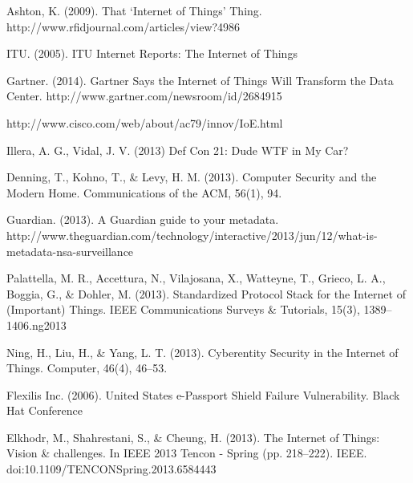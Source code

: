 \documentclass[10pt,journal,compsoc]{IEEEtran}
\begin{document}

%
%
%
\begin{thebibliography}{1}

Ashton, K. (2009). That `Internet of Things' Thing. http://www.rfidjournal.com/articles/view?4986

ITU. (2005). ITU Internet Reports: The Internet of Things

Gartner. (2014). Gartner Says the Internet of Things Will Transform the Data Center. http://www.gartner.com/newsroom/id/2684915

http://www.cisco.com/web/about/ac79/innov/IoE.html

Illera, A. G., Vidal, J. V. (2013) Def Con 21: Dude WTF in My Car?  

Denning, T., Kohno, T., \& Levy, H. M. (2013). Computer Security and the Modern Home. Communications of the ACM, 56(1), 94. 

Guardian. (2013). A Guardian guide to your metadata. http://www.theguardian.com/technology/interactive/2013/jun/12/what-is-metadata-nsa-surveillance

Palattella, M. R., Accettura, N., Vilajosana, X., Watteyne, T., Grieco, L. A., Boggia, G., \& Dohler, M. (2013). Standardized Protocol Stack for the Internet of (Important) Things. IEEE Communications Surveys \& Tutorials, 15(3), 1389–1406.ng2013 

Ning, H., Liu, H., \& Yang, L. T. (2013). Cyberentity Security in the Internet of Things. Computer, 46(4), 46–53. 

Flexilis Inc. (2006). United States e-Passport Shield Failure Vulnerability. Black Hat Conference

Elkhodr, M., Shahrestani, S., \& Cheung, H. (2013). The Internet of Things: Vision \& challenges. In IEEE 2013 Tencon - Spring (pp. 218–222). IEEE. doi:10.1109/TENCONSpring.2013.6584443


\end{thebibliography}
\end{document}

